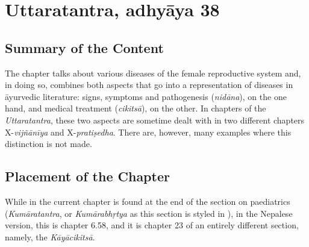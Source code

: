 
\section{Uttaratantra, adhyāya 38}

\subsection{Summary of the Content}
The chapter talks about various diseases of the female reproductive system and, in 
doing so, combines both aspects that go into a representation of diseases in āyurvedic 
literature: signs, symptoms and pathogenesis (\emph{nidāna}), on the one hand, and 
medical treatment (\emph{cikitsā}), on the other. In chapters of the 
\emph{Uttaratantra}, these two aspects are sometime dealt with in two different 
chapters X-\emph{vijñānīya} and X-\emph{pratiṣedha}. There are, however, many 
examples where this distinction is not made. 


\subsection{Placement of the Chapter}

While in \cite{vulgate} the current chapter is found at the end of the section on 
paediatrics (\emph{Kumāratantra}, or \emph{Kumārabhṛtya} as this section is 
styled in ), in the Nepalese version, this is chapter 
6.58, and it is chapter 23 of an entirely different section, namely, the 
\emph{Kāyācikitsā}.

